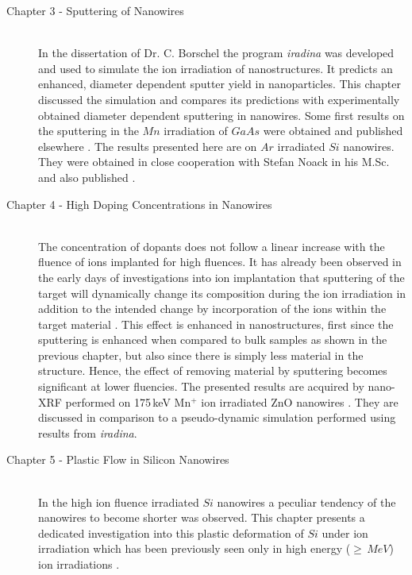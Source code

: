 \begin{description}
  \item[\normalfont Chapter 3 - Sputtering of Nanowires] \hfill \\
  In the dissertation of Dr. C. Borschel \cite{borschel_ion-solid_2012} the program \emph{iradina} \cite{borschel_ion_2011} was developed and used to simulate the ion irradiation of nanostructures. It predicts an enhanced, diameter dependent sputter yield in nanoparticles. This chapter discussed the simulation and compares its predictions with experimentally obtained diameter dependent sputtering in nanowires. Some first results on the sputtering in the $Mn$ irradiation of $GaAs$ were obtained and published elsewhere \cite{johannes_enhanced_2014}. The results presented here are on $Ar$ irradiated $Si$ nanowires. They were obtained in close cooperation with Stefan Noack in his M.Sc. and also published .
  \item[\normalfont Chapter 4 - High Doping Concentrations in Nanowires] \hfill \\
  The concentration of dopants does not follow a linear increase with the fluence of ions implanted for high fluences. It has already been observed in the early days of investigations into ion implantation that sputtering of the target will dynamically change its composition during the ion irradiation in addition to the intended change by incorporation of the ions within the target material \cite{moller_tridyn-binary_1988,moller_tri3dyn_2014}. This effect is enhanced in nanostructures, first since the sputtering is enhanced when compared to bulk samples as shown in the previous chapter, but also since there is simply less material in the structure. Hence, the effect of removing material by sputtering becomes significant at lower fluencies. The presented results are acquired by nano-XRF performed on 175\,keV Mn$^+$ ion irradiated ZnO nanowires \cite{johannes_enhanced_2014}. They are discussed in comparison to a pseudo-dynamic simulation performed using results from \emph{iradina}.
  \item[\normalfont Chapter 5 - Plastic Flow in Silicon Nanowires] \hfill \\
  In the high ion fluence irradiated $Si$ nanowires a peculiar tendency of the nanowires to become shorter was observed. This chapter presents a dedicated investigation into this plastic deformation of $Si$ under ion irradiation which has been previously seen only in high energy ($\ge\,MeV$) ion irradiations \cite{volkert_stress_1991,trinkaus_viscoelastic_1995,hedler_amorphous_2004,hedler_boundary_2005}.
\end{description}
